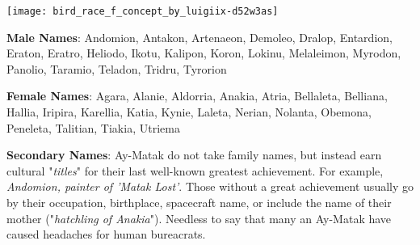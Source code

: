 \texttt{[image: bird\_race\_f\_concept\_by\_luigiix-d52w3as]}

\textbf{Male Names}: Andomion, Antakon, Artenaeon, Demoleo, Dralop, Entardion, Eraton, Eratro, Heliodo, Ikotu, Kalipon, Koron, Lokinu, Melaleimon, Myrodon, Panolio, Taramio, Teladon, Tridru, Tyrorion

\textbf{Female Names}: Agara, Alanie, Aldorria, Anakia, Atria, Bellaleta, Belliana, Hallia, Iripira, Karellia, Katia, Kynie, Laleta, Nerian, Nolanta, Obemona, Peneleta, Talitian, Tiakia, Utriema

\textbf{Secondary Names}: Ay-Matak do not take family names, but instead earn cultural "\textit{titles}" for their last well-known greatest achievement. For example, \textit{Andomion, painter of 'Matak Lost'}. Those without a great achievement usually go by their occupation, birthplace, spacecraft name, or include the name of their mother ("\textit{hatchling of Anakia}"). Needless to say that many an Ay-Matak have caused headaches for human bureacrats.

